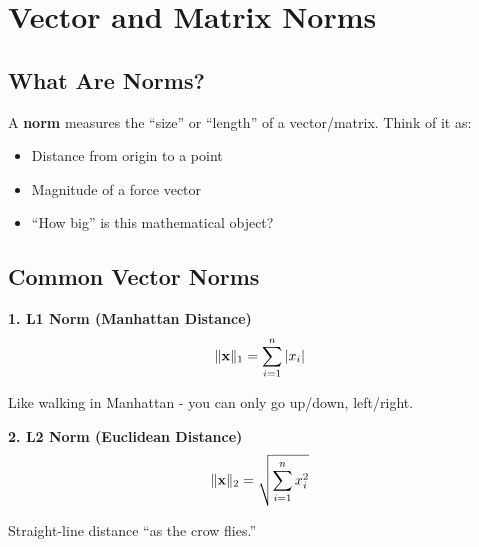 \documentclass{article}
\begin{document}
\begin{center}
\end{center}

\section{Vector and Matrix Norms}

\subsection{What Are Norms?}

A \textbf{norm} measures the ``size'' or ``length'' of a vector/matrix. Think of it as:
\begin{itemize}
    \item Distance from origin to a point
    \item Magnitude of a force vector
    \item ``How big'' is this mathematical object?
\end{itemize}

\subsection{Common Vector Norms}

\textbf{1. L1 Norm (Manhattan Distance)}
$$\|\mathbf{x}\|_1 = \sum_{i=1}^n |x_i|$$

Like walking in Manhattan - you can only go up/down, left/right.

\textbf{2. L2 Norm (Euclidean Distance)}
$$\|\mathbf{x}\|_2 = \sqrt{\sum_{i=1}^n x_i^2}$$

Straight-line distance ``as the crow flies.''
\end{document}
